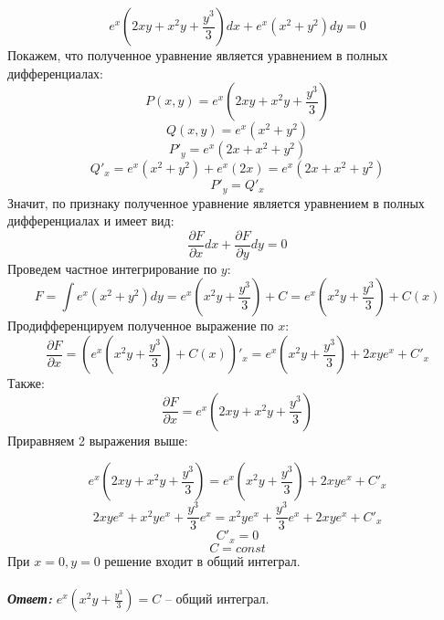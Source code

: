 \documentclass[a5paper, 10pt]{article}
\theoremstyle{definition}
\theoremstyle{plain}
\theoremstyle{remark}
\begin{document}
\begin{equation*}
e^x \left( 2xy + x^2y+\frac{y^3}{3} \right)dx + e^x \left(x^2 + y^2 \right)dy = 0
\end{equation*}
Покажем, что полученное уравнение является уравнением в полных дифференциалах:
\begin{equation*}
P(x, y) = e^x \left( 2xy + x^2y+\frac{y^3}{3} \right)
\end{equation*}
\begin{equation*}
Q(x, y) =  e^x \left(x^2 + y^2 \right)
\end{equation*}
\begin{equation*}
P'_y= e^x \left( 2x + x^2+y^2 \right)
\end{equation*}
\begin{equation*}
Q'_x =  e^x \left(x^2 + y^2 \right) + e^x \left(2x \right)  = e^x \left(2x + x^2 + y^2 \right) 
\end{equation*}
\begin{equation*}
P'_y= Q'_x 
\end{equation*}
Значит, по признаку полученное уравнение является уравнением в полных дифференциалах и имеет вид:
\begin{equation*}
\frac{\partial F}{\partial x} dx + \frac{\partial F}{\partial y} dy = 0
\end{equation*}
Проведем частное интегрирование по $y$:
\begin{equation*}
F = \int  e^x \left(x^2 + y^2 \right)dy =  e^x \left( x^2 y + \frac{y^3}{3} \right) + C =   e^x \left( x^2 y + \frac{y^3}{3} \right) + C(x)
\end{equation*}
Продифференцируем полученное выражение по $x$:
\begin{equation*}
\frac{\partial F}{\partial x} = \left( e^x \left( x^2 y + \frac{y^3}{3} \right) + C(x) \right)'_x =  e^x \left( x^2 y + \frac{y^3}{3} \right) + 2xy e^x+ C'_x
\end{equation*}
Также:
\begin{equation*}
\frac{\partial F}{\partial x} =  e^x \left( 2xy + x^2y+\frac{y^3}{3} \right)
\end{equation*}
Приравняем 2 выражения выше:

\begin{equation*}
e^x \left( 2xy + x^2y+\frac{y^3}{3} \right)  =  e^x \left( x^2 y + \frac{y^3}{3} \right) + 2xy e^x+ C'_x
\end{equation*}
\begin{equation*}
2xye^x + x^2ye^x+\frac{y^3}{3} e^x  =  x^2 ye^x + \frac{y^3}{3}e^x  + 2xy e^x+ C'_x
\end{equation*}
\begin{equation*}
C'_x = 0
\end{equation*}
\begin{equation*}
C = const
\end{equation*}
При $x = 0, y = 0$ решение входит в общий интеграл.\\\\
\textit{\textbf{Ответ:}} $ e^x \left( x^2 y + \frac{y^3}{3} \right) = C$ -- общий интеграл.
\newpage
\end{document}
